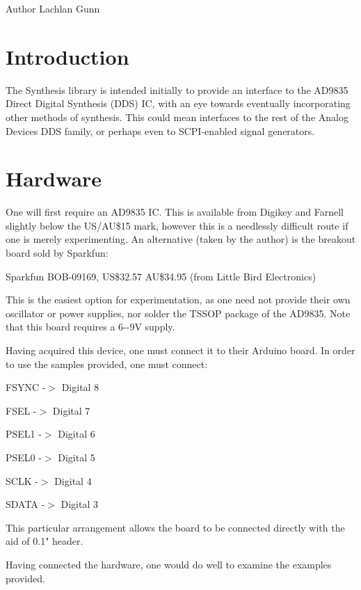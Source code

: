 \begin{DoxyAuthor}{Author}
Lachlan Gunn
\end{DoxyAuthor}
\hypertarget{index_Introduction}{}\section{Introduction}\label{index_Introduction}
The Synthesis library is intended initially to provide an interface to the AD9835 Direct Digital Synthesis (DDS) IC, with an eye towards eventually incorporating other methods of synthesis. This could mean interfaces to the rest of the Analog Devices DDS family, or perhaps even to SCPI-\/enabled signal generators.\hypertarget{index_Hardware}{}\section{Hardware}\label{index_Hardware}
One will first require an AD9835 IC. This is available from Digikey and Farnell slightly below the US/AU\$15 mark, however this is a needlessly difficult route if one is merely experimenting. An alternative (taken by the author) is the breakout board sold by Sparkfun:


\begin{DoxyItemize}
\item Sparkfun BOB-\/09169, US\$32.57 AU\$34.95 (from Little Bird Electronics)
\end{DoxyItemize}

This is the easiest option for experimentation, as one need not provide their own oscillator or power supplies, nor solder the TSSOP package of the AD9835. Note that this board requires a 6-\/-\/9V supply.

Having acquired this device, one must connect it to their Arduino board. In order to use the samples provided, one must connect:


\begin{DoxyItemize}
\item FSYNC -\/$>$ Digital 8
\item FSEL -\/$>$ Digital 7
\item PSEL1 -\/$>$ Digital 6
\item PSEL0 -\/$>$ Digital 5
\item SCLK -\/$>$ Digital 4
\item SDATA -\/$>$ Digital 3
\end{DoxyItemize}

This particular arrangement allows the board to be connected directly with the aid of 0.1" header.

Having connected the hardware, one would do well to examine the examples provided. 